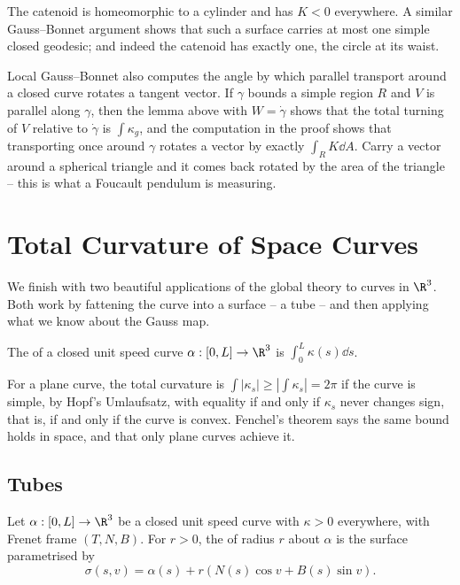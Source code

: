 \begin{example}
    The catenoid is homeomorphic to a cylinder and has $K < 0$ everywhere. A similar Gauss--Bonnet argument shows that such a surface carries at most one simple closed geodesic; and indeed the catenoid has exactly one, the circle at its waist.
\end{example}

\begin{remark}
    Local Gauss--Bonnet also computes the angle by which parallel transport around a closed curve rotates a tangent vector. If $\gamma$ bounds a simple region $R$ and $V$ is parallel along $\gamma$, then the lemma above with $W = \dot\gamma$ shows that the total turning of $V$ relative to $\dot\gamma$ is $\int\kappa_g$, and the computation in the proof shows that transporting once around $\gamma$ rotates a vector by exactly $\int_R K \dd A$. Carry a vector around a spherical triangle and it comes back rotated by the area of the triangle -- this is what a Foucault pendulum is measuring.
\end{remark}

\section{Total Curvature of Space Curves}

We finish with two beautiful applications of the global theory to curves in $\R^3$. Both work by fattening the curve into a surface -- a tube -- and then applying what we know about the Gauss map.

\begin{definition}
    The  of a closed unit speed curve $\alpha: [0,L] \rightarrow \R^3$ is $\int_0^L \kappa(s)\dd s$.
\end{definition}

For a plane curve, the total curvature is $\int|\kappa_s| \geq |\int\kappa_s| = 2\pi$ if the curve is simple, by Hopf's Umlaufsatz, with equality if and only if $\kappa_s$ never changes sign, that is, if and only if the curve is convex. Fenchel's theorem says the same bound holds in space, and that only plane curves achieve it.

\subsection{Tubes}

\begin{definition}[Tube]
    Let $\alpha: [0,L] \rightarrow \R^3$ be a closed unit speed curve with $\kappa > 0$ everywhere, with Frenet frame $(T, N, B)$. For $r > 0$, the  of radius $r$ about $\alpha$ is the surface parametrised by
    $$
    \sigma(s, v) = \alpha(s) + r\left(N(s)\cos v + B(s)\sin v\right).
    $$
\end{definition}

